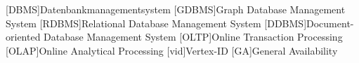 
\begin{acronym}[Abkürzungsverzeichnis]
	[DBMS]{Datenbankmanagementsystem}
	[GDBMS]{Graph Database Management System}
	[RDBMS]{Relational Database Management System}
	[DDBMS]{Document-oriented Database Management System}
	[OLTP]{Online Transaction Processing}
	[OLAP]{Online Analytical Processing}
	[vid]{Vertex-ID}
	[GA]{General Availability}
\end{acronym}